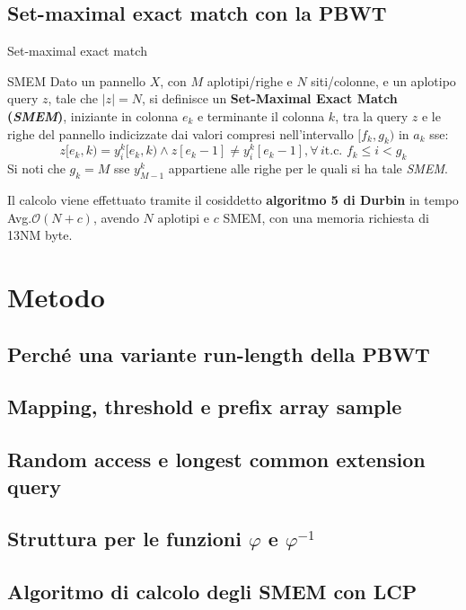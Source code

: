 \documentclass{beamer}
\begin{document}
\subsection{Set-maximal exact match con la PBWT}
\begin{frame}{Set-maximal exact match}
  \begin{block}{SMEM}
    Dato un pannello $X$, con $M$ aplotipi/righe e $N$ siti/colonne, e un
    aplotipo 
    query $z$, tale che $|z|=N$, si definisce un \textbf{Set-Maximal Exact Match 
      (\textit{SMEM})}, iniziante in colonna $e_k$ e terminante il colonna
    $k$, tra 
    la query $z$ e le righe del pannello indicizzate dai valori compresi
    nell'intervallo $[f_k,g_k)$ in $a_k$ sse:
    \[z[e_k,k)=y_i^k[e_k,k)\land z[e_k-1]\neq y_i^k[e_k-1], \forall\, i\mbox{
        t.c. }f_k\leq i < g_k\]
    Si noti che $g_k=M$ sse $y_{M-1}^k$ appartiene alle righe per le quali si ha
    tale \textit{SMEM}.
  \end{block}
  \begin{block}{}
    Il calcolo viene effettuato tramite il cosiddetto \textbf{algoritmo 5 di
      Durbin}\cite{pbwt} in tempo Avg.$\mathcal{O}(N+c)$\cite{dpbwt}, avendo $N$
    aplotipi e 
    $c$ SMEM, con una memoria richiesta di 13NM byte.
  \end{block}
\end{frame}
\section{Metodo}
\subsection{Perché una variante run-length della PBWT}
\subsection{Mapping, threshold e prefix array sample}
\subsection{Random access e longest common extension query}
\subsection{Struttura per le funzioni $\varphi$ e $\varphi^{-1}$}
\subsection{Algoritmo di calcolo degli SMEM con LCP}
\end{document}

